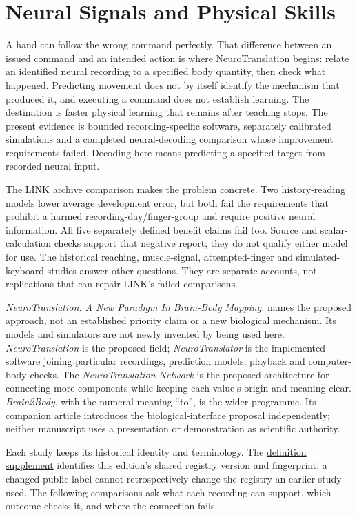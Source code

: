 \section{Neural Signals and Physical Skills}

A hand can follow the wrong command perfectly. That difference between an issued command and an intended action is where NeuroTranslation begins: relate an identified neural recording to a specified body quantity, then check what happened. Predicting movement does not by itself identify the mechanism that produced it, and executing a command does not establish learning. The destination is faster physical learning that remains after teaching stops. The present evidence is bounded recording-specific software, separately calibrated simulations and a completed neural-decoding comparison whose improvement requirements failed. Decoding here means predicting a specified target from recorded neural input.

The LINK archive comparison makes the problem concrete. Two history-reading models lower average development error, but both fail the requirements that prohibit a harmed recording-day/finger-group and require positive neural information. All five separately defined benefit claims fail too. Source and scalar-calculation checks support that negative report; they do not qualify either model for use. The historical reaching, muscle-signal, attempted-finger and simulated-keyboard studies answer other questions. They are separate accounts, not replications that can repair LINK's failed comparisons.

\emph{NeuroTranslation: A New Paradigm In Brain-Body Mapping.} names the proposed approach, not an established priority claim or a new biological mechanism. Its models and simulators are not newly invented by being used here. \emph{NeuroTranslation} is the proposed field; \emph{NeuroTranslator} is the implemented software joining particular recordings, prediction models, playback and computer-body checks. The \emph{NeuroTranslation Network} is the proposed architecture for connecting more components while keeping each value's origin and meaning clear. \emph{Brain2Body}, with the numeral meaning ``to'', is the wider programme. Its companion article introduces the biological-interface proposal independently; neither manuscript uses a presentation or demonstration as scientific authority.\citep{brain2bodyworking}

Each study keeps its historical identity and terminology. The \hyperref[programme-definitions]{definition supplement} identifies this edition's shared registry version and fingerprint; a changed public label cannot retrospectively change the registry an earlier study used. The following comparisons ask what each recording can support, which outcome checks it, and where the connection fails.

